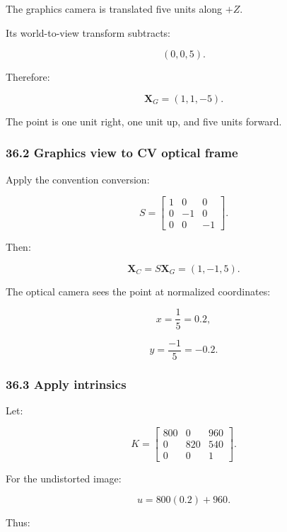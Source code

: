 \hypertarget{02-foundations-ii-ch037-world-to-graphics-view}{}

The graphics camera is translated five units along \(+Z\).

Its world-to-view transform subtracts:

\[
 (0,0,5).
\]

Therefore:

\[
 \boxed{ \mathbf X_G=(1,1,-5) }.
\]

The point is one unit right, one unit up, and five units forward.

\subsubsection{36.2 Graphics view to CV optical frame}\label{02-foundations-ii-ch037-graphics-view-to-cv-optical-frame}

\hypertarget{02-foundations-ii-ch037-graphics-view-to-cv-optical-frame}{}

Apply the convention conversion:

\[
 S= \begin{bmatrix} 1&0&0\\ 0&-1&0\\ 0&0&-1 \end{bmatrix}.
\]

Then:

\[
 \boxed{ \mathbf X_C=S\mathbf X_G=(1,-1,5) }.
\]

The optical camera sees the point at normalized coordinates:

\[
 x=\frac15=0.2,
\]

\[
 y=\frac{-1}{5}=-0.2.
\]

\subsubsection{36.3 Apply intrinsics}\label{02-foundations-ii-ch037-apply-intrinsics}

\hypertarget{02-foundations-ii-ch037-apply-intrinsics}{}

Let:

\[
 K= \begin{bmatrix} 800&0&960\\ 0&820&540\\ 0&0&1 \end{bmatrix}.
\]

For the undistorted image:

\[
 u=800(0.2)+960.
\]

Thus:

